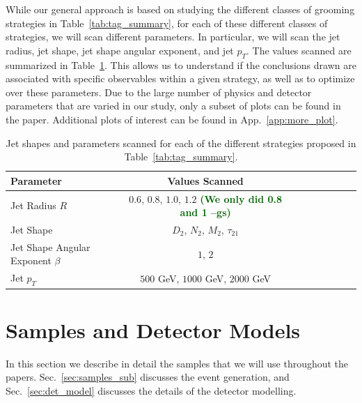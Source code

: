 \documentclass[11pt,letterpaper]{article}
\DeclareRobustCommand{\Sec}[1]{Sec.~\ref{#1}}
\DeclareRobustCommand{\App}[1]{App.~\ref{#1}}
\DeclareRobustCommand{\Tab}[1]{Table~\ref{#1}}
\newcommand{\gs}[1]{\textbf{\textcolor{darkgreen}{(#1 --gs)}}}
\begin{document}
While our general approach is based on studying the different classes of grooming strategies in \Tab{tab:tag_summary}, for each of these different classes of strategies, we will scan different parameters. In particular, we will scan the jet radius, jet shape, jet shape angular exponent, and jet $p_T$. The values scanned are summarized in \Tab{tab:params}. This allows us to understand if the conclusions drawn are associated with specific observables within a given strategy, as well as to optimize over these parameters. Due to the large number of physics and detector parameters that are varied in our study, only a subset of plots can be found in the paper. Additional plots of interest can be found in \App{app:more_plot}.



\begin{table}
\begin{center}
\begin{tabular}{| l | c | c |c |c|c|c |c|r| }
  \hline                       
  Parameter &  Values Scanned \\
  \hline
  Jet Radius $R$ &   $0.6$, $0.8$, $1.0$, $1.2$ \gs{We only did 0.8 and 1} \\
  Jet Shape  &   $D_2$, $N_2$, $M_2$, $\tau_{21}$  \\
  Jet Shape Angular Exponent $\beta$ &   $1$, $2$ \\
  Jet $p_T$ &   $500$ GeV, $1000$ GeV, $2000$ GeV  \\
  \hline  
\end{tabular}
\end{center}
\caption{
Jet shapes and parameters scanned for each of the different strategies proposed in \Tab{tab:tag_summary}.
}
\label{tab:params}
\end{table}












\section{Samples and Detector Models}\label{sec:samples}


In this section we describe in detail the samples that we will use throughout the papers. \Sec{sec:samples_sub} discusses the event generation, and \Sec{sec:det_model} discusses the details of the detector modelling. 
\end{document}
